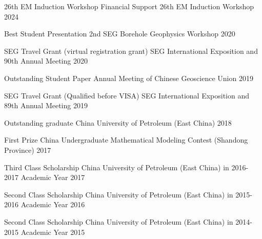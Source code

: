 
\begin{cvhonors}

  \cvhonor
    {26th EM Induction Workshop Financial Support} %
    {26th EM Induction Workshop} %
    {} %
    {2024} %

  \cvhonor
    {Best Student Presentation} %
    {2nd SEG Borehole Geophysics Workshop} %
    {} %
    {2020} %

  \cvhonor
    {SEG Travel Grant (virtual registration grant)} %
    {SEG International Exposition and 90th Annual Meeting} %
    {} %
    {2020} %

  \cvhonor
    {Outstanding Student Paper} %
    {Annual Meeting of Chinese Geoscience Union} %
    {} %
    {2019} %

  \cvhonor
    {SEG Travel Grant (Qualified before VISA)} %
    {SEG International Exposition and 89th Annual Meeting} %
    {} %
    {2019} %

  \cvhonor
    {Outstanding graduate} %
    {China University of Petroleum (East China)} %
    {} %
    {2018} %

  \cvhonor
    {First Prize} %
    {China Undergraduate Mathematical Modeling Contest (Shandong Province)} %
    {} %
    {2017} %

  \cvhonor
    {Third Class Scholarship} %
    {China University of Petroleum (East China) in 2016-2017 Academic Year} %
    {} %
    {2017} %

  \cvhonor
    {Second Class Scholarship} %
    {China University of Petroleum (East China) in 2015-2016 Academic Year} %
    {} %
    {2016} %

  \cvhonor
    {Second Class Scholarship} %
    {China University of Petroleum (East China) in 2014-2015 Academic Year} %
    {} %
    {2015} %

\end{cvhonors}
